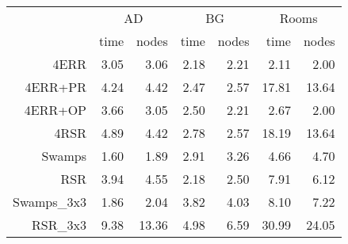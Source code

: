 \begin{table}[ht]
\label{table:results}
\begin{center}
\begin{tabular}{rrrrrrr}
  \hline
 & \multicolumn{2}{c}{AD} & \multicolumn{2}{c}{BG} & \multicolumn{2}{c}{Rooms} \\
 & time & nodes & time & nodes & time & nodes \\ 
  \hline
  4ERR & 3.05 & 3.06 & 2.18 & 2.21 & 2.11 & 2.00 \\ 
  4ERR+PR & 4.24 & 4.42 & 2.47 & 2.57 & 17.81 & 13.64 \\ 
  4ERR+OP & 3.66 & 3.05 & 2.50 & 2.21 & 2.67 & 2.00 \\ 
  4RSR & 4.89 & 4.42 & 2.78 & 2.57 & 18.19 & 13.64 \\ 
  Swamps & 1.60 & 1.89 & 2.91 & 3.26 & 4.66 & 4.70 \\ 
  RSR & 3.94 & 4.55 & 2.18 & 2.50 & 7.91 & 6.12 \\ 
  Swamps\_3x3 & 1.86 & 2.04 & 3.82 & 4.03 & 8.10 & 7.22 \\ 
  RSR\_3x3 & 9.38 & 13.36 & 4.98 & 6.59 & 30.99 & 24.05 \\ 
   \hline
\end{tabular}
\end{center}
\end{table}

